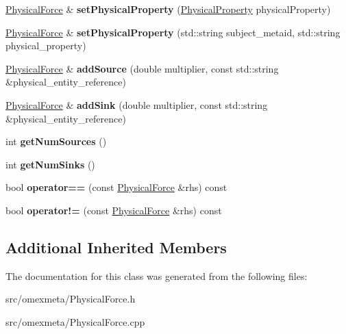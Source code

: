 \begin{DoxyCompactItemize}
\hyperlink{classomexmeta_1_1PhysicalForce}{Physical\+Force} \& {\bfseries set\+Physical\+Property} (\hyperlink{classomexmeta_1_1PhysicalProperty}{Physical\+Property} physical\+Property)
\item 
\mbox{\label{classomexmeta_1_1PhysicalForce_a3f979432322d40efc8a15cf5ee883100}} 
\hyperlink{classomexmeta_1_1PhysicalForce}{Physical\+Force} \& {\bfseries set\+Physical\+Property} (std\+::string subject\+\_\+metaid, std\+::string physical\+\_\+property)
\item 
\mbox{\label{classomexmeta_1_1PhysicalForce_adfb620f6e28476dce6aa5b0d7d5b9546}} 
\hyperlink{classomexmeta_1_1PhysicalForce}{Physical\+Force} \& {\bfseries add\+Source} (double multiplier, const std\+::string \&physical\+\_\+entity\+\_\+reference)
\item 
\mbox{\label{classomexmeta_1_1PhysicalForce_a7dca33926e787589d5a58de50fc1be1d}} 
\hyperlink{classomexmeta_1_1PhysicalForce}{Physical\+Force} \& {\bfseries add\+Sink} (double multiplier, const std\+::string \&physical\+\_\+entity\+\_\+reference)
\item 
\mbox{\label{classomexmeta_1_1PhysicalForce_a9910c8edac57daf70faa1f1e2e0208d1}} 
int {\bfseries get\+Num\+Sources} ()
\item 
\mbox{\label{classomexmeta_1_1PhysicalForce_a1135c75705b59afa7037bab313009534}} 
int {\bfseries get\+Num\+Sinks} ()
\item 
\mbox{\label{classomexmeta_1_1PhysicalForce_affa0a1f3cdce0a3336d56658a92c65f3}} 
bool {\bfseries operator==} (const \hyperlink{classomexmeta_1_1PhysicalForce}{Physical\+Force} \&rhs) const
\item 
\mbox{\label{classomexmeta_1_1PhysicalForce_aeb7adb235c0caac04c7aa599f98f258a}} 
bool {\bfseries operator!=} (const \hyperlink{classomexmeta_1_1PhysicalForce}{Physical\+Force} \&rhs) const
\end{DoxyCompactItemize}
\subsection*{Additional Inherited Members}


The documentation for this class was generated from the following files\+:\begin{DoxyCompactItemize}
\item 
src/omexmeta/Physical\+Force.\+h\item 
src/omexmeta/Physical\+Force.\+cpp\end{DoxyCompactItemize}
